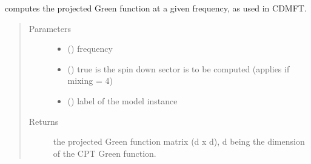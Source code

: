 \documentclass[letterpaper,10pt,english]{sphinxmanual}
\begin{document}
\begin{fulllineitems}
\label{\detokenize{functions:pyqcm.projected_Green_function}}
\sphinxAtStartPar
computes the projected Green function at a given frequency, as used in CDMFT.
\begin{quote}\begin{description}
\item[{Parameters}] \leavevmode\begin{itemize}
\item {} 
\sphinxAtStartPar
{} () \textendash{} frequency

\item {} 
\sphinxAtStartPar
{} () \textendash{} true is the spin down sector is to be computed (applies if mixing = 4)

\item {} 
\sphinxAtStartPar
{} () \textendash{} label of the model instance

\end{itemize}

\item[{Returns}] \leavevmode
\sphinxAtStartPar
the projected Green function matrix (d x d), d being the dimension of the CPT Green function.

\end{description}\end{quote}

\end{fulllineitems}

\end{document}

